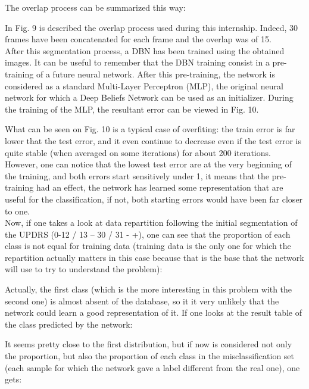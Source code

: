\documentclass{report}
\begin{document}
		 The overlap process can be summarized this way:
		 
		 
		 In Fig. 9 is described the overlap process used during this internship. Indeed, 30 frames have been concatenated for each frame and the overlap was of 15.\\
		 
		 After this segmentation process, a DBN has been trained using the obtained images. It can be useful to remember that the DBN training consist in a pre-training of a future neural network. After this pre-training, the network is considered as a standard Multi-Layer Perceptron (MLP), the original neural network for which a Deep Beliefs Network can be used as an initializer. During the training of the MLP, the resultant error can be viewed in Fig. 10.
		 
		 
		 What can be seen on Fig. 10 is a typical case of overfiting: the train error is far lower that the test error, and it even continue to decrease even if the test error is quite stable (when averaged on some iterations) for about 200 iterations. However, one can notice that the lowest test error are at the very beginning of the training, and both errors start sensitively under 1, it means that the pre-training had an effect, the network has learned some representation that are useful for the classification, if not, both starting errors would have been far closer to one.\\
		 
		 Now, if one takes a look at data repartition following the initial segmentation of the UPDRS (0-12 / 13 – 30 / 31 - +), one can see that the proportion of each class is not equal for training data (training data is the only one for which the repartition actually matters in this case because that is the base that the network will use to try to understand the problem):
		 
		 
		 Actually, the first class (which is the more interesting in this problem with the second one) is almost absent of the database, so it it very unlikely that the network could learn a good representation of it.
		 If one looks at the result table of the class predicted by the network:
		 
		 
		 It seems pretty close to the first distribution, but if now is considered not only the proportion, but also the proportion of each class in the misclassification set (each sample for which the network gave a label different from the real one), one gets:
		 
\end{document}
